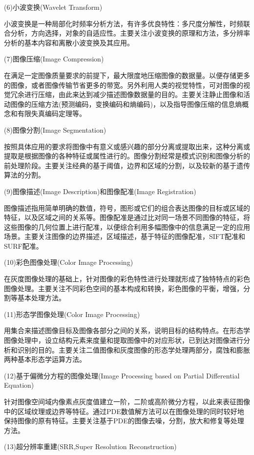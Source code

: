 \documentclass[11pt]{article}
\begin{document}
(6)小波变换(Wavelet Transform)

小波变换是一种局部化时频率分析方法，有许多优良特性：多尺度分解性，时频联合分析，方向选择，对象的自适应性。主要关注小波变换的原理和方法，多分辨率分析的基本内容和离散小波变换及其应用。

(7)图像压缩(Image Compression)

在满足一定图像质量要求的前提下，最大限度地压缩图像的数据量。以便存储更多的图像，或者图像传输节省更多的带宽。另外利用人类的视觉特性，可对图像的视觉冗余进行压缩，由此来达到减少描述图像数据量的目的。主要关注静止图像和活动图像的压缩方法(预测编码，变换编码和熵编码)，以及指导图像压缩的信息熵概念和有限失真编码定理等。

(8)图像分割(Image Segmentation)

按照具体应用的要求将图像中有意义或感兴趣的部分分离或提取出来，这种分离或提取是根据图像的各种特征或属性进行的。图像分割经常是模式识别和图像分析的前处理阶段。主要关注经典的基于阈值，边界和区域的分割，以及较新的基于遗传算法的分割。

(9)图像描述(Image Description)和图像配准(Image Registration)

图像描述指用简单明确的数值，符号，图形或它们的组合表达图像的目标或区域的特征，以及区域之间的关系等。图像配准是通过比对同一场景不同图像的特征，将这些图像的几何位置上进行配准，以便综合利用多幅图像中的信息满足一定的应用场景。主要关注图像的边界描述，区域描述，基于特征的图像配准，SIFT配准和SURF配准。

(10)彩色图像处理(Color Image Processing)

在灰度图像处理的基础上，针对图像的彩色特性进行处理就形成了独特特点的彩色图像处理。主要关注不同彩色空间的基本构成和转换，彩色图像的平衡，增强，分割等基本处理方法。

(11)形态学图像处理(Color Image Processing)

用集合来描述图像目标及图像各部分之间的关系，说明目标的结构特点。在形态学图像处理中，设立结构元素来度量和提取图像中的对应形状，已到达对图像进行分析和识别的目的。主要关注二值图像和灰度图像的形态学处理两部分，腐蚀和膨胀两种基本形态学运算方法。

(12)基于偏微分方程的图像处理(Image Processing based on Partial Differential Equation)

针对图像空间域内像素点灰度值建立一阶，二阶或高阶微分方程，以此来表征图像中的区域纹理或边界等特征。通过PDE数值解方法可以在图像处理的同时较好地保持图像的原有特征。主要关注基于PDE的图像去噪，分割，放大和修复等处理方法。

(13)超分辨率重建(SRR,Super Resolution Reconstruction)
\end{document}
